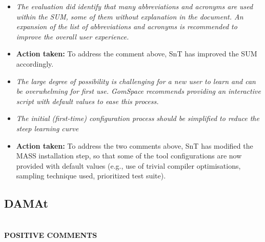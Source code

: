\begin{itemize}

  \item \emph{The evaluation did identify that many abbreviations and acronyms are used within the SUM, some of them without explanation in the document. An expansion of the list of abbreviations and acronyms is recommended to improve the overall user experience.}

  \item \textbf{Action taken:} To address the comment above, SnT has improved the SUM accordingly.

  \item \emph{The large degree of possibility is challenging for a new user to learn and can be overwhelming for first use. GomSpace recommends providing an interactive script with default values to ease this process.}

  \item \emph{The initial (first-time) configuration process should be simplified to reduce the steep learning curve}

  \item \textbf{Action taken:} To address the two comments above, SnT has modified the MASS installation step, so that some of the tool configurations are now provided with default values (e.g., use of trivial compiler optimisations, sampling technique used, prioritized test suite).

\end{itemize}

\subsection{DAMAt} \ \\

\textbf{POSITIVE COMMENTS}

